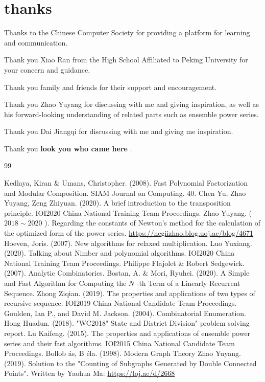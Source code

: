 \section* { thanks }

Thanks to the Chinese Computer Society for providing a platform for learning and communication.

Thank you Xiao Ran from the High School Affiliated to Peking University for your concern and guidance.

Thank you family and friends for their support and encouragement.

Thank you Zhao Yuyang for discussing with me and giving inspiration, as well as his forward-looking understanding of related parts such as ensemble power series.

Thank you Dai Jiangqi for discussing with me and giving me inspiration.

\ifcont
Thank you \textbf { look{ \color {red}you who came here} }.
\fi

\begin { thebibliography }{99}
\ifcont
{}
\fi
{} Kedlaya, Kiran \& Umans, Christopher. (2008). Fast Polynomial Factorization and Modular Composition. SIAM Journal on Computing. 40. 
 Chen Yu, Zhao Yuyang, Zeng Zhiyuan. (2020). A brief introduction to the transposition principle. IOI2020 China National Training Team Proceedings.
 Zhao Yuyang. ( $ 2018 \sim  2020 $ ). Regarding the constants of Newton's method for the calculation of the optimized form of the power series. \url {https://negiizhao.blog.uoj.ac/blog/4671}
 Hoeven, Joris. (2007). New algorithms for relaxed multiplication. 
 Luo Yuxiang. (2020). Talking about Nimber and polynomial algorithms. IOI2020 China National Training Team Proceedings.
 Philippe Flajolet \& Robert Sedgewick. (2007). Analytic Combinatorics.
 Bostan, A. \& Mori, Ryuhei. (2020). A Simple and Fast Algorithm for Computing the $ N $ -th Term of a Linearly Recurrent Sequence. 
 Zhong Ziqian. (2019). The properties and applications of two types of recursive sequence. IOI2019 China National Candidate Team Proceedings.
 Goulden, Ian P., and David M. Jackson. (2004). Combinatorial Enumeration.
 Hong Huadun. (2018). "WC2018" State and District Division" problem solving report.
 Lu Kaifeng. (2015). The properties and applications of ensemble power series and their fast algorithms. IOI2015 China National Candidate Team Proceedings.
 Bollob \' as, B \' ela. (1998). Modern Graph Theory
 Zhao Yuyang. (2019). Solution to the "Counting of Subgraphs Generated by Double Connected Points". Written by Yaohua Ma: \url {https://loj.ac/d/2668}
\end { thebibliography }